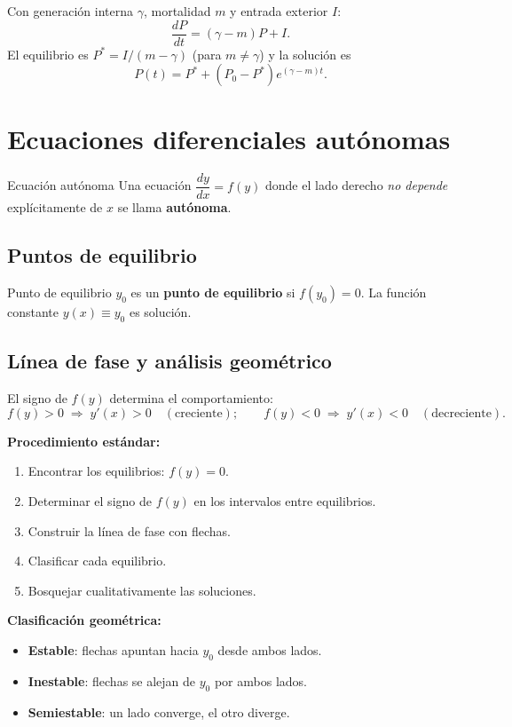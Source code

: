 \documentclass[11pt,letterpaper]{article}
\begin{document}
Con generación interna $\gamma$, mortalidad $m$ y entrada exterior $I$:
\[
\frac{dP}{dt}=(\gamma-m)P+I.
\]
El equilibrio es $P^*=I/(m-\gamma)$ (para $m\neq\gamma$) y la solución es
\[
P(t)=P^*+(P_0-P^*)e^{(\gamma-m)t}.
\]

\section{Ecuaciones diferenciales autónomas}

\begin{definicion}{Ecuación autónoma}{}
Una ecuación $\dfrac{dy}{dx}=f(y)$ donde el lado derecho \emph{no depende}
explícitamente de $x$ se llama \textbf{autónoma}.
\end{definicion}

\subsection{Puntos de equilibrio}

\begin{definicion}{Punto de equilibrio}{}
$y_0$ es un \textbf{punto de equilibrio} si $f(y_0)=0$.
La función constante $y(x)\equiv y_0$ es solución.
\end{definicion}

\subsection{Línea de fase y análisis geométrico}

El signo de $f(y)$ determina el comportamiento:
\[
f(y)>0\;\Rightarrow\; y'(x)>0\quad(\text{creciente});\qquad
f(y)<0\;\Rightarrow\; y'(x)<0\quad(\text{decreciente}).
\]

\textbf{Procedimiento estándar:}
\begin{enumerate}
    \item Encontrar los equilibrios: $f(y)=0$.
    \item Determinar el signo de $f(y)$ en los intervalos entre equilibrios.
    \item Construir la línea de fase con flechas.
    \item Clasificar cada equilibrio.
    \item Bosquejar cualitativamente las soluciones.
\end{enumerate}

\textbf{Clasificación geométrica:}
\begin{itemize}
    \item \textbf{Estable}: flechas apuntan hacia $y_0$ desde ambos lados.
    \item \textbf{Inestable}: flechas se alejan de $y_0$ por ambos lados.
    \item \textbf{Semiestable}: un lado converge, el otro diverge.
\end{itemize}
\end{document}
